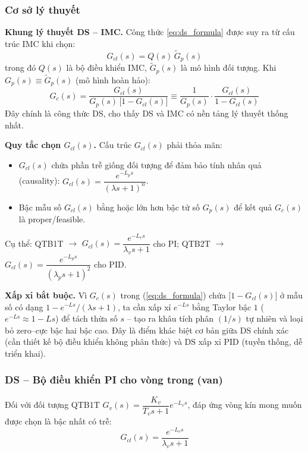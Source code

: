 \documentclass[../main.tex]{subfiles}
\begin{document}
\subsubsection{Cơ sở lý thuyết}

\textbf{Khung lý thuyết DS -- IMC.} Công thức \ref{eq:ds_formula} được suy ra từ cấu trúc IMC khi chọn:
\begin{equation}
    G_{cl}(s) = Q(s)\,\tilde{G}_p(s)
\end{equation}
trong đó $Q(s)$ là bộ điều khiển IMC, $\tilde{G}_p(s)$ là mô hình đối tượng. Khi $G_p(s) \equiv \tilde{G}_p(s)$ (mô hình hoàn hảo):
\begin{equation}
    G_c(s) = \frac{G_{cl}(s)}{G_p(s)\,\bigl[1 - G_{cl}(s)\bigr]} \equiv \frac{1}{G_p(s)} \cdot \frac{G_{cl}(s)}{1 - G_{cl}(s)}
\end{equation}
Đây chính là công thức DS, cho thấy DS và IMC có nền tảng lý thuyết thống nhất.

\textbf{Quy tắc chọn $G_{cl}(s)$.} Cấu trúc $G_{cl}(s)$ phải thỏa mãn:
\begin{itemize}
    \item $G_{cl}(s)$ chứa phần trễ giống đối tượng để đảm bảo tính nhân quả (causality): $G_{cl}(s) = \dfrac{e^{-L_p s}}{(\lambda s + 1)^n}$.
    \item Bậc mẫu số $G_{cl}(s)$ bằng hoặc lớn hơn bậc tử số $G_p(s)$ để kết quả $G_c(s)$ là proper/feasible.
\end{itemize}
Cụ thể: QTB1T $\rightarrow$ $G_{cl}(s) = \dfrac{e^{-L_v s}}{\lambda_v s + 1}$ cho PI; QTB2T $\rightarrow$ $G_{cl}(s) = \dfrac{e^{-L_p s}}{(\lambda_p s + 1)^2}$ cho PID.

\textbf{Xấp xỉ bắt buộc.} Vì $G_c(s)$ trong (\ref{eq:ds_formula}) chứa $\bigl[1 - G_{cl}(s)\bigr]$ ở mẫu số có dạng $1 - e^{-Ls}/(\lambda s+1)$, ta cần xấp xỉ $e^{-Ls}$ bằng Taylor bậc $1$ ($e^{-Ls} \approx 1 - L s$) để tách thừa số $s$ -- tạo ra khâu tích phân $(1/s)$ tự nhiên và loại bỏ zero--cực bậc hai bậc cao. Đây là điểm khác biệt cơ bản giữa DS chính xác (cần thiết kế bộ điều khiển không phân thức) và DS xấp xỉ PID (tuyền thống, dễ triển khai).

\subsubsection{DS -- Bộ điều khiển PI cho vòng trong (van)}

Đối với đối tượng QTB1T $G_v(s) = \dfrac{K_v}{T_v s + 1}e^{-L_v s}$, đáp ứng vòng kín mong muốn được chọn là bậc nhất có trễ:
\begin{equation}
    G_{cl}(s) = \frac{e^{-L_v s}}{\lambda_v s + 1}
    \label{eq:ds_cl_fopdt}
\end{equation}
\end{document}
